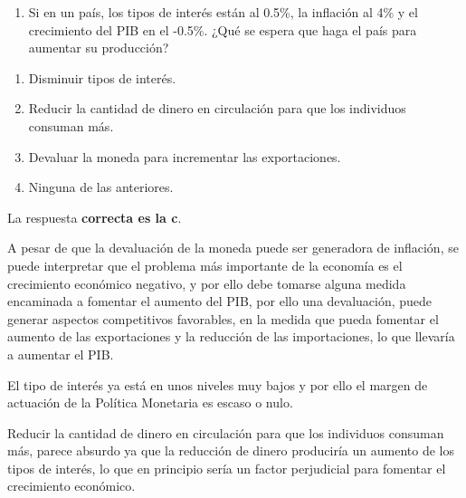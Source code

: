 \documentclass[
  letterpaper,
  DIV=11,
  numbers=noendperiod]{scrreprt}
\providecommand{\tightlist}{%
  \setlength{\itemsep}{0pt}\setlength{\parskip}{0pt}}\usepackage{longtable,booktabs,array}
\begin{document}

\begin{enumerate}
\def\labelenumi{\arabic{enumi}.}
\tightlist
\item
  Si en un país, los tipos de interés están al 0.5\%, la inflación al
  4\% y el crecimiento del PIB en el -0.5\%. ¿Qué se espera que haga el
  país para aumentar su producción?
\end{enumerate}

\begin{enumerate}
\def\labelenumi{\alph{enumi})}
\item
  Disminuir tipos de interés.
\item
  Reducir la cantidad de dinero en circulación para que los individuos
  consuman más.
\item
  Devaluar la moneda para incrementar las exportaciones.
\item
  Ninguna de las anteriores.
\end{enumerate}

\begin{tcolorbox}[enhanced jigsaw, left=2mm, opacityback=0, colback=white, breakable, arc=.35mm, bottomrule=.15mm, rightrule=.15mm, toprule=.15mm, leftrule=.75mm, colframe=quarto-callout-tip-color-frame]
\begin{minipage}[t]{5.5mm}
\textcolor{quarto-callout-tip-color}{\faLightbulb}
\end{minipage}%
\begin{minipage}[t]{\textwidth - 5.5mm}

La respuesta \textbf{correcta es la c}.

A pesar de que la devaluación de la moneda puede ser generadora de
inflación, se puede interpretar que el problema más importante de la
economía es el crecimiento económico negativo, y por ello debe tomarse
alguna medida encaminada a fomentar el aumento del PIB, por ello una
devaluación, puede generar aspectos competitivos favorables, en la
medida que pueda fomentar el aumento de las exportaciones y la reducción
de las importaciones, lo que llevaría a aumentar el PIB.

El tipo de interés ya está en unos niveles muy bajos y por ello el
margen de actuación de la Política Monetaria es escaso o nulo.

Reducir la cantidad de dinero en circulación para que los individuos
consuman más, parece absurdo ya que la reducción de dinero produciría un
aumento de los tipos de interés, lo que en principio sería un factor
perjudicial para fomentar el crecimiento económico.

\end{minipage}%
\end{tcolorbox}
\end{document}
